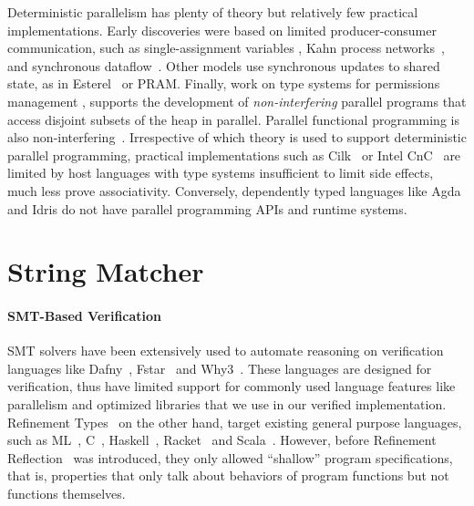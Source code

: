 %
Deterministic parallelism has plenty of theory but relatively few practical
implementations.  Early discoveries were based on limited producer-consumer
communication, such as single-assignment variables \cite{Tesler-1968,IStructures}, Kahn
process networks~\cite{kahn-1974}, and synchronous dataflow~\cite{lee-sdf}.
Other models use synchronous updates to shared state, as in
Esterel~\cite{synchronous-overview} or PRAM.  Finally, work on type systems for
permissions management \cite{permission-types,habanero-java-permissions},
supports the development of {\em non-interfering} parallel programs that access
disjoint subsets of the heap in parallel.  Parallel functional programming is
also non-interfering~\cite{manticore,multicore-ghc}.
%
Irrespective of which theory is used to support deterministic parallel
programming, practical implementations such as Cilk~\cite{cilk} or Intel
CnC~\cite{cnc} are limited by host languages with type systems insufficient to
limit side effects, much less prove associativity.  Conversely, dependently
typed languages like Agda and Idris do not have parallel programming APIs and
runtime systems.



\section{String Matcher}\label{sec:stringmatcher:related}


\paragraph{SMT-Based Verification}
%
SMT solvers have been extensively used to automate
reasoning on verification languages like
Dafny~\cite{dafny}, Fstar~\cite{fstar} and Why3~\cite{why3}.
%
These languages are designed for verification,
thus have limited support for commonly used language
features like parallelism and optimized libraries
that we use in our verified implementation.
%
Refinement Types~\cite{ConstableS87,FreemanPfenning91,Rushby98}
on the other hand, target existing general purpose languages,
such as
ML~\cite{pfenningxi98,GordonTOPLAS2011,LiquidPLDI08},
C~\cite{deputy,LiquidPOPL10},
Haskell~\cite{Vazou14},
Racket~\cite{RefinedRacket}
and Scala~\cite{refinedscala}.
However, before Refinement Reflection~\cite{reflection} was introduced,
they only allowed ``shallow'' program specifications,
that is, properties that only talk about behaviors of program functions
but not functions themselves.
%

